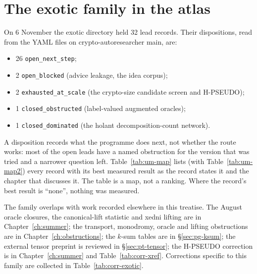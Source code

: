 \section{The exotic family in the atlas}\label{sec:um-atlas}

On 6 November the exotic directory held 32 lead records. Their
dispositions, read from the YAML files on crypto-autoresearcher main, are:
\begin{itemize}
\item 26 \texttt{open\_next\_step};
\item 2 \texttt{open\_blocked} (advice leakage, the idea corpus);
\item 2 \texttt{exhausted\_at\_scale} (the crypto-size candidate screen and
  H-PSEUDO);
\item 1 \texttt{closed\_obstructed} (label-valued augmented oracles);
\item 1 \texttt{closed\_dominated} (the holant decomposition-count network).
\end{itemize}
A disposition records what the programme does next, not whether the route
works: most of the open leads have a named obstruction for the version
that was tried and a narrower question left. Table~\ref{tab:um-map} lists
(with Table~\ref{tab:um-map2}) every record with its best measured result as
the record states it and the chapter that discusses it. The table is a map, not a ranking. Where the
record's best result is ``none'', nothing was measured.

The family overlaps with work recorded elsewhere in this treatise. The
August oracle closures, the canonical-lift statistic and xedni lifting are
in Chapter~\ref{ch:summer}; the transport, monodromy, oracle and lifting
obstructions are in Chapter~\ref{ch:obstructions}; the $k$-sum tables are
in \S\ref{sec:pg-ksum}; the external tensor preprint is reviewed in
\S\ref{sec:pt-tensor}; the H-PSEUDO correction is in Chapter~\ref{ch:summer}
and Table~\ref{tab:corr-xref}. Corrections specific to this family are
collected in Table~\ref{tab:corr-exotic}.

